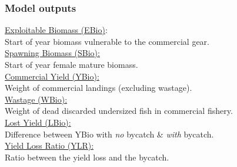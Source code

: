\documentclass{beamer}
\begin{document}
\begin{frame}[t]\frametitle{Model outputs}
	\underline{Exploitable Biomass (EBio)}:\\
	Start of year biomass vulnerable to the commercial gear.\\
	\pause \medskip
	\underline{Spawning Biomass (SBio):}\\
	Start of year female mature biomass.\\
	\pause \medskip
	\underline{Commercial Yield (YBio):}\\
	Weight of commercial landings (excluding wastage).\\
	\pause \medskip
	\underline{Wastage (WBio):}\\
	Weight of dead discarded undersized fish in commercial fishery.\\
	\pause \medskip
	\underline{Lost Yield (LBio):}\\
	Difference between YBio with \emph{no} bycatch \& \emph{with} bycatch.\\
	\pause \medskip
	\underline{Yield Loss Ratio (YLR):}\\
	Ratio between the yield loss and the bycatch.\\
\end{frame}
\end{document}
